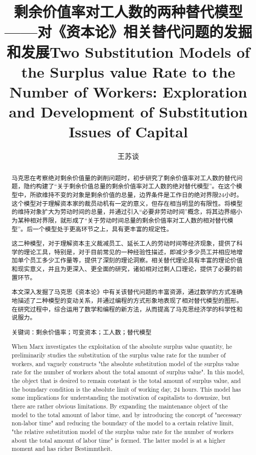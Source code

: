 \documentclass[a4paper,11pt]{ctexart}
\title{剩余价值率对工人数的两种替代模型——对《资本论》相关替代问题的发掘和发展\newline Two Substitution Models of the Surplus value Rate to the Number of Workers: Exploration and Development of Substitution Issues of Capital}
\author{王苏谈}
\begin{document}
\maketitle
\tableofcontents
\newpage

\begin{abstract}

马克思在考察绝对剩余价值量的剥削问题时，初步研究了剩余价值率对工人数的替代问题，隐约构建了“关于剩余价值总量的剩余价值率对工人数的绝对替代模型”。在这个模型中，所欲维持不变的对象是剩余价值的总量，边界条件是工作日的绝对界限24小时。这个模型对于理解资本家的裁员动机有一定的意义，但存在相当明显的有限性。将模型的维持对象扩大为劳动时间的总量，并通过引入“必要非劳动时间”概念，将其边界缩小为某种相对界限，就形成了“关于劳动时间总量的剩余价值率对工人数的相对替代模型”。后一个模型处于更高环节之上，具有更丰富的规定性。

这二种模型，对于理解资本主义裁减员工、延长工人的劳动时间等经济现象，提供了科学的理论工具，特别是，对于目前常见的一种经验性描述，即减少多少员工并相应地增加单个员工多少工作量等，提供了深刻的理论洞察。相关替代理论具有丰富的理论价值和现实意义，并且为更深入、更全面的研究，诸如相对过剩人口理论，提供了必要的前置环节。

本文深入发掘了马克思《资本论》中有关该替代问题的丰富资源，通过数学的方式准确地描述了二种模型的变动关系，并通过编程的方式形象地表现了相对替代模型的图形。在研究过程中，综合运用了数学和编程的新方法，从而提高了马克思经济学的科学性和说服力。

关键词：剩余价值率；可变资本；工人数；替代模型

When Marx investigates the exploitation of the absolute surplus value quantity, he preliminarily studies the substitution of the surplus value rate for the number of workers, and vaguely constructs "the absolute substitution model of the surplus value rate for the number of workers about the total amount of surplus value". In this model, the object that is desired to remain constant is the total amount of surplus value, and the boundary condition is the absolute limit of working day, 24 hours. This model has some implications for understanding the motivation of capitalists to downsize, but there are rather obvious limitations. By expanding the maintenance object of the model to the total amount of labor time, and by introducing the concept of "necessary non-labor time" and reducing the boundary of the model to a certain relative limit, "the relative substitution model of the surplus value rate for the number of workers about the total amount of labor time" is formed. The latter model is at a higher moment and has richer Bestimmtheit.


\end{abstract}
\end{document}
